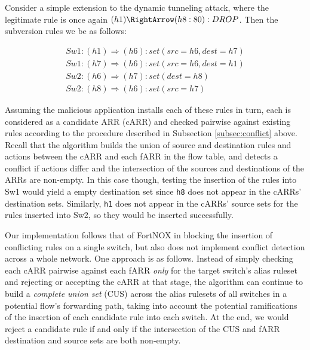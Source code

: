 Consider a simple extension to the dynamic tunneling attack, where the legitimate rule is once again $(h1) \RightArrow (h8:80): DROP$. Then the subversion rules we be as follows: 

\begin{align}
  Sw1: (h1) \Rightarrow (h6): set(src=h6, dest=h7) \\
  Sw1: (h7) \Rightarrow (h6): set(src=h6, dest=h1) \\
  Sw2: (h6) \Rightarrow (h7): set(dest=h8) \\
  Sw2: (h8) \Rightarrow (h6): set(src=h7)
\end{align}

Assuming the malicious application installs each of these rules in turn, each is considered as a candidate ARR (cARR) and checked pairwise against existing rules according to the procedure described in Subsection \ref{subsec:conflict} above. Recall that the algorithm builds the union of source and destination rules and actions between the cARR and each fARR in the flow table, and detects a conflict if actions differ and the intersection of the sources and destinations of the ARRs are non-empty. In this case though, testing the insertion of the rules into Sw1 would yield a empty destination set since \texttt{h8} does not appear in the cARRs' destination sets. Similarly, \texttt{h1} does not appear in the cARRs' source sets for the rules inserted into Sw2, so they would be inserted successfully. 

Our implementation follows that of FortNOX in blocking the insertion of conflicting rules on a single switch, but also does not implement conflict detection across a whole network. One approach is as follows. Instead of simply checking each cARR pairwise against each fARR \emph{only} for the target switch's alias ruleset and rejecting or accepting the cARR at that stage, the algorithm can continue to build a \emph{complete union set} (CUS) across the alias rulesets of all switches in a potential flow's forwarding path, taking into account the potential ramifications of the insertion of each candidate rule into each switch. At the end, we would reject a candidate rule if and only if the intersection of the CUS and fARR destination and source sets are both non-empty. 

